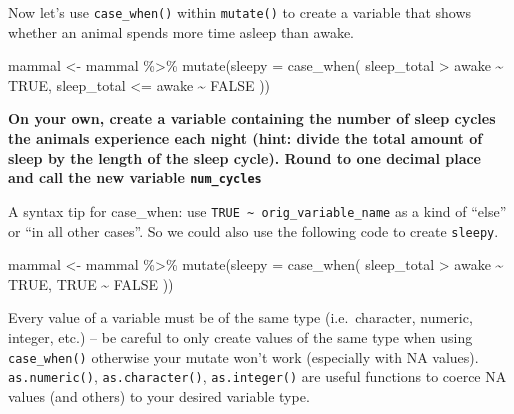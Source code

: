 \documentclass[]{article}
\newenvironment{Shaded}{\begin{snugshade}}{\end{snugshade}}
\newcommand{\AttributeTok}[1]{\textcolor[rgb]{0.77,0.63,0.00}{#1}}
\newcommand{\ConstantTok}[1]{\textcolor[rgb]{0.00,0.00,0.00}{#1}}
\newcommand{\FunctionTok}[1]{\textcolor[rgb]{0.00,0.00,0.00}{#1}}
\newcommand{\NormalTok}[1]{#1}
\newcommand{\OtherTok}[1]{\textcolor[rgb]{0.56,0.35,0.01}{#1}}
\newcommand{\SpecialCharTok}[1]{\textcolor[rgb]{0.00,0.00,0.00}{#1}}
\begin{document}
Now let's use \texttt{case\_when()} within \texttt{mutate()} to create a
variable that shows whether an animal spends more time asleep than
awake.

\begin{Shaded}
\begin{Highlighting}[]
\NormalTok{mammal }\OtherTok{\textless{}{-}}\NormalTok{ mammal }\SpecialCharTok{\%\textgreater{}\%}
  \FunctionTok{mutate}\NormalTok{(}\AttributeTok{sleepy =} \FunctionTok{case\_when}\NormalTok{(}
\NormalTok{    sleep\_total }\SpecialCharTok{\textgreater{}}\NormalTok{ awake }\SpecialCharTok{\textasciitilde{}} \ConstantTok{TRUE}\NormalTok{,}
\NormalTok{    sleep\_total }\SpecialCharTok{\textless{}=}\NormalTok{ awake }\SpecialCharTok{\textasciitilde{}} \ConstantTok{FALSE}
\NormalTok{  ))}
\end{Highlighting}
\end{Shaded}

\textbf{On your own, create a variable containing the number of sleep
cycles the animals experience each night (hint: divide the total amount
of sleep by the length of the sleep cycle). Round to one decimal place
and call the new variable \texttt{num\_cycles}}

A syntax tip for case\_when: use
\texttt{TRUE\ \textasciitilde{}\ orig\_variable\_name} as a kind of
``else'' or ``in all other cases''. So we could also use the following
code to create \texttt{sleepy}.

\begin{Shaded}
\begin{Highlighting}[]
\NormalTok{mammal }\OtherTok{\textless{}{-}}\NormalTok{ mammal }\SpecialCharTok{\%\textgreater{}\%}
  \FunctionTok{mutate}\NormalTok{(}\AttributeTok{sleepy =} \FunctionTok{case\_when}\NormalTok{(}
\NormalTok{    sleep\_total }\SpecialCharTok{\textgreater{}}\NormalTok{ awake }\SpecialCharTok{\textasciitilde{}} \ConstantTok{TRUE}\NormalTok{,}
    \ConstantTok{TRUE} \SpecialCharTok{\textasciitilde{}} \ConstantTok{FALSE}
\NormalTok{  ))}
\end{Highlighting}
\end{Shaded}

Every value of a variable must be of the same type (i.e.~character,
numeric, integer, etc.) -- be careful to only create values of the same
type when using \texttt{case\_when()} otherwise your mutate won't work
(especially with NA values). \texttt{as.numeric()},
\texttt{as.character()}, \texttt{as.integer()} are useful functions to
coerce NA values (and others) to your desired variable type.
\end{document}

